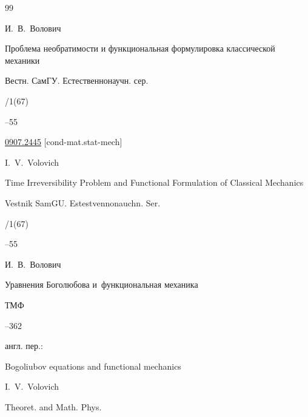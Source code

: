 


\begin{thebibliography}{99}




\by И.~В.~Волович

\paper Проблема необратимости и функциональная формулировка классической механики

\jour Вестн. СамГУ. Естественнонаучн. сер.


/1(67)

–55

\arxiv \href{http://arxiv.org/abs/0907.2445}{0907.2445} [cond-mat.stat-mech] 

\misctransl

\by I.~V.~Volovich

\paper Time Irreversibility Problem and Functional Formulation of Classical Mechanics

\jour Vestnik SamGU. Estestvennonauchn. Ser.


/1(67)

–55








\by И.~В.~Волович

\paper Уравнения Боголюбова и~функциональная механика

\jour ТМФ




--362




\transl англ. пер.:~

\paper Bogoliubov equations and functional mechanics

\by I.~V.~Volovich 

\jour Theoret. and Math. Phys.



\end{thebibliography}
